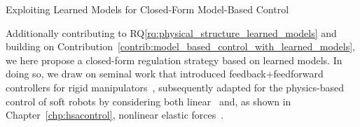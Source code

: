 \begin{contribution}\label{contrib:model_based_control_with_learned_models}
    Exploiting Learned Models for Closed-Form Model-Based Control
\end{contribution}
Additionally contributing to \gls{RQ}\ref{rq:physical_structure_learned_models} and building on Contribution~\ref{contrib:model_based_control_with_learned_models}, we here propose a closed-form regulation strategy based on learned models. In doing so, we draw on seminal work that introduced feedback+feedforward controllers for rigid manipulators~\citep{kelly1996class, kelly1997pd, kelly1998global, sciavicco2012modelling}, subsequently adapted for the physics-based control of soft robots by considering both linear~\citep{della2020model, della2023model} and, as shown in Chapter~\ref{chp:hsacontrol}, nonlinear elastic forces~\citep{borja2022energy}.
